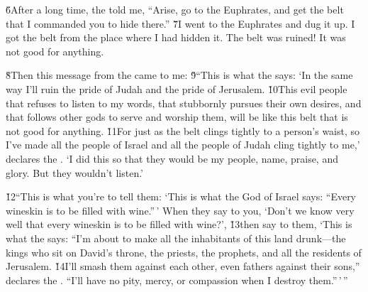 \v{6}After a long time, the  told me, ``Arise, go to the Euphrates, and get the belt that I commanded you to hide there.'' \v{7}I went to the Euphrates and dug it up. I got the belt from the place where I had hidden it. The belt was ruined! It was not good for anything.

\v{8}Then this message from the  came to me: \v{9}``This is what the  says: `In the same way I'll ruin the pride of Judah and the pride of Jerusalem. \v{10}This evil people that refuses to listen to my words, that stubbornly pursues their own desires, and that follows other gods to serve and worship them, will be like this belt that is not good for anything. \v{11}For just as the belt clings tightly to a person's waist, so I've made all the people of Israel and all the people of Judah cling tightly to me,' declares the . `I did this so that they would be my people, name, praise, and glory. But they wouldn't listen.'

\v{12}``This is what you're to tell them: `This is what the  God of Israel says: ``Every wineskin is to be filled with wine.''\,' When they say to you, `Don't we know very well that every wineskin is to be filled with wine?', \v{13}then say to them, `This is what the  says: ``I'm about to make all the inhabitants of this land drunk---the kings who sit on David's throne, the priests, the prophets, and all the residents of Jerusalem. \v{14}I'll smash them against each other, even fathers against their sons,'' declares the . ``I'll have no pity, mercy, or compassion when I destroy them.''\,'\,''

